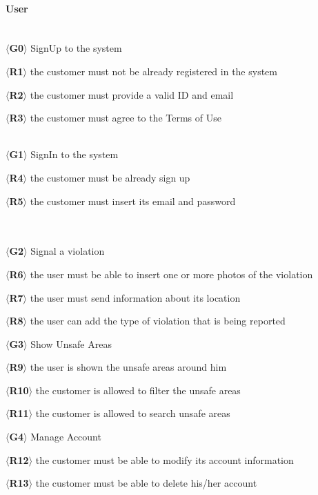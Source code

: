 \documentclass{article}
\begin{document}
\paragraph{User}\mbox{}\\
$\langle$\textbf{G0}$\rangle$ SignUp to the system
\begin{description}
    \item $\langle$\textbf{R1}$\rangle$ the customer must not be already
    registered  in the system
    \item $\langle$\textbf{R2}$\rangle$ the customer must provide a valid ID and
    email
    \item $\langle$\textbf{R3}$\rangle$ the customer must agree to the Terms of
Use \end{description}\mbox{}\\
$\langle$\textbf{G1}$\rangle$ SignIn to the system
\begin{description}
    \item $\langle$\textbf{R4}$\rangle$ the customer must be already sign up
    \item $\langle$\textbf{R5}$\rangle$ the customer must insert its email and
    password \end{description}\mbox{}\\\\
$\langle$\textbf{G2}$\rangle$ Signal a violation
\begin{description}
    \item $\langle$\textbf{R6}$\rangle$ the user must be able to insert one or
    more photos of the violation
    \item $\langle$\textbf{R7}$\rangle$ the user must send information about its
    location
    \item $\langle$\textbf{R8}$\rangle$ the user can add the type of violation
    that is being reported
\end{description}
$\langle$\textbf{G3}$\rangle$ Show Unsafe Areas
\begin{description}
    \item $\langle$\textbf{R9}$\rangle$ the user is shown the unsafe areas
    around him
    \item $\langle$\textbf{R10}$\rangle$ the customer is allowed to filter the
    unsafe areas
    \item $\langle$\textbf{R11}$\rangle$ the customer is allowed to search
    unsafe areas 
\end{description}    
$\langle$\textbf{G4}$\rangle$ Manage Account
\begin{description}
    \item $\langle$\textbf{R12}$\rangle$ the customer must be able to modify its
    account information
    \item $\langle$\textbf{R13}$\rangle$ the customer must be able to delete
    his/her account
\end{description}
\end{document}

